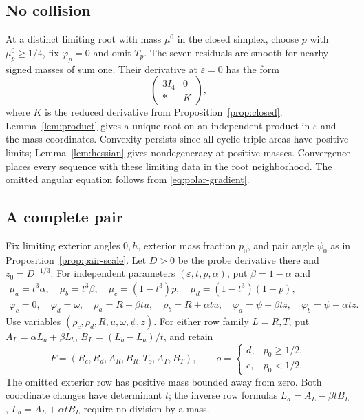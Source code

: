 \documentclass[11pt,a4paper]{article}
\numberwithin{equation}{section}
\theoremstyle{remark}
\newcommand{\eps}{\varepsilon}
\begin{document}
\subsection{No collision}
At a distinct limiting root with mass $\mu^0$ in the closed simplex, choose $p$ with $\mu_p^0\ge1/4$, fix $\varphi_p=0$ and omit $T_p$. The seven residuals are smooth for nearby signed masses of sum one. Their derivative at $\eps=0$ has the form
\[
 \begin{pmatrix}3I_4&0\\ *&K\end{pmatrix},
\]
where $K$ is the reduced derivative from Proposition~\ref{prop:closed}. Lemma~\ref{lem:product} gives a unique root on an independent product in $\eps$ and the mass coordinates. Convexity persists since all cyclic triple areas have positive limits; Lemma~\ref{lem:hessian} gives nondegeneracy at positive masses. Convergence places every sequence with these limiting data in the root neighborhood. The omitted angular equation follows from \eqref{eq:polar-gradient}.

\subsection{A complete pair}
\label{subsec:pair-chart}
Fix limiting exterior angles $0,h$, exterior mass fraction $p_0$, and pair angle $\psi_0$ as in Proposition~\ref{prop:pair-scale}. Let $D>0$ be the probe derivative there and $z_0=D^{-1/3}$. For independent parameters $(\eps,t,p,\alpha)$, put $\beta=1-\alpha$ and
\begin{gather}
 \mu_a=t^3\alpha,\quad\mu_b=t^3\beta,\quad
 \mu_c=(1-t^3)p,\quad\mu_d=(1-t^3)(1-p),\label{eq:pair-chart-mass}\\
 \varphi_c=0,\quad\varphi_d=\omega,\quad
 \rho_a=R-\beta tu,\quad\rho_b=R+\alpha tu,\quad
 \varphi_a=\psi-\beta tz,\quad\varphi_b=\psi+\alpha tz.\label{eq:pair-coordinates}
\end{gather}
Use variables $(\rho_c,\rho_d,R,u,\omega,\psi,z)$. For either row family $L=R,T$, put $A_L=\alpha L_a+\beta L_b$, $B_L=(L_b-L_a)/t$, and retain
\[
 F=(R_c,R_d,A_R,B_R,T_o,A_T,B_T),\qquad
 o=\begin{cases}d,&p_0\ge1/2,\\c,&p_0<1/2.\end{cases}
\]
The omitted exterior row has positive mass bounded away from zero. Both coordinate changes have determinant $t$; the inverse row formulas $L_a=A_L-\beta tB_L$, $L_b=A_L+\alpha tB_L$ require no division by a mass.
\end{document}
